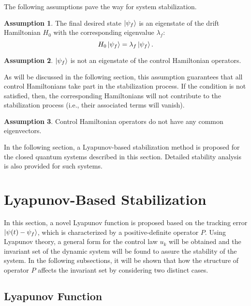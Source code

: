 \documentclass[journal]{IEEEtran}
\theoremstyle{definition}
\newtheorem{assum}{Assumption}
\begin{document}
\par The following assumptions pave the way for system stabilization.
\begin{assum}\label{H_0,f}
The final desired state $\ket{\psi_f}$ is an eigenstate of the drift Hamiltonian $H_0$ with the corresponding eigenvalue $\lambda_f$: 
\begin{equation}\label{H_0}
    H_0\ket{\psi_f}=\lambda_f\ket{\psi_f}.
\end{equation}
\end{assum}
\begin{assum}
$\ket{\psi_f}$ is not an eigenstate of the control Hamiltonian operators. 
\end{assum}
As will be discussed in the following section, this assumption guarantees that all control Hamiltonians take part in the stabilization process. If the condition is not satisfied, then, the corresponding Hamiltonians will not contribute to the stabilization process (i.e., their associated terms will vanish). 
\begin{assum}\label{assumH}
Control Hamiltonian operators do not have any common eigenvectors.
\end{assum}

\par In the following section, a Lyapunov-based stabilization method is proposed for the closed quantum systems described in this section. Detailed stability analysis is also provided for such systems.

\section{Lyapunov-Based Stabilization}\label{Lyapunov}

In this section, a novel Lyapunov function is proposed based on the tracking error $\ket{\psi{(t)}-\psi_f}$, which is characterized by a positive-definite operator $P$. Using Lyapunov theory, a general form for the control law $u_k$ will be obtained and the invariant set of the dynamic system will be found to assure the stability of the system. In the following subsections, it will be shown that how the structure of operator $P$ affects the invariant set by considering two distinct cases.

\subsection{Lyapunov Function}\label{Lyapunov function}
\end{document}

